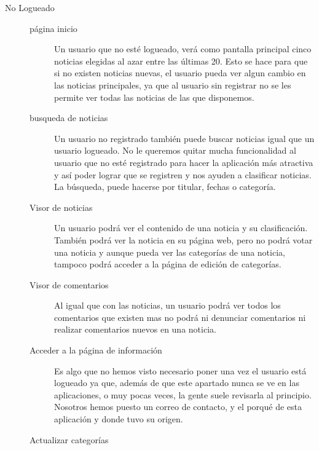 \begin{description}
\item[No Logueado]
	\begin{description}
		\item[página inicio]
			Un usuario que no esté logueado, verá como pantalla principal cinco noticias elegidas al azar entre las últimas 20. Esto se hace para que si no existen noticias nuevas, el usuario pueda ver algun cambio en las noticias principales, ya que al usuario sin registrar no se les permite ver todas las noticias de las que disponemos.
		\item[busqueda de noticias]
			Un usuario no registrado también puede buscar noticias igual que un usuario logueado. No le queremos quitar mucha funcionalidad al usuario que no esté registrado para hacer la aplicación más atractiva y así poder lograr que se registren y nos ayuden a clasificar noticias. La búsqueda, puede hacerse por titular, fechas o categoría.
		\item[Visor de noticias]
			Un usuario podrá ver el contenido de una noticia y su clasificación. También podrá ver la noticia en su página web, pero no podrá votar una noticia y aunque pueda ver las categorías de una noticia, tampoco podrá acceder a la página de edición de categorías.
		\item[Visor de comentarios]
			Al igual que con las noticias, un usuario podrá ver todos los comentarios que existen mas no podrá ni denunciar comentarios ni realizar comentarios nuevos en una noticia.
		\item[Acceder a la página de información]
			Es algo que no hemos visto necesario poner una vez el usuario está logueado ya que, además de que este apartado nunca se ve en las aplicaciones, o muy pocas veces, la gente suele revisarla al principio. Nosotros hemos puesto un correo de contacto, y el porqué de esta aplicación y donde tuvo su origen.
		\item[Actualizar categorías]

	\end{description}


\end{description}
